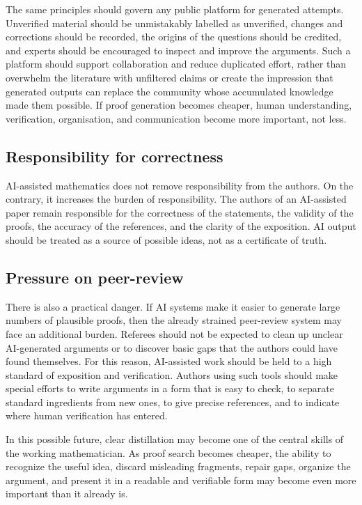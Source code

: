 \documentclass[11pt,reqno]{amsart}
\theoremstyle{plain}
\theoremstyle{definition}
\begin{document}
The same principles should govern any public platform for generated attempts. Unverified material should be unmistakably labelled as unverified, changes and corrections should be recorded, the origins of the questions should be credited, and experts should be encouraged to inspect and improve the arguments. Such a platform should support collaboration and reduce duplicated effort, rather than overwhelm the literature with unfiltered claims or create the impression that generated outputs can replace the community whose accumulated knowledge made them possible. If proof generation becomes cheaper, human understanding, verification, organisation, and communication become more important, not less.

\subsection{Responsibility for correctness}

AI-assisted mathematics does not remove responsibility from the authors.  On the contrary, it increases the burden of responsibility.  The authors of an AI-assisted paper remain responsible for the correctness of the statements, the validity of the proofs, the accuracy of the references, and the clarity of the exposition.  AI output should be treated as a source of possible ideas, not as a certificate of truth.

\subsection{Pressure on peer-review}

There is also a practical danger. If AI systems make it easier to generate large numbers of plausible proofs, then the already strained peer-review system may face an additional burden.  Referees should not be expected to clean up unclear AI-generated arguments or to discover basic gaps that the authors could have found themselves.  For this reason, AI-assisted work should be held to a high standard of exposition and verification. Authors using such tools should make special efforts to write arguments in a form that is easy to check, to separate standard ingredients from new ones, to give precise references, and to indicate where human verification has entered.

In this possible future, clear distillation may become one of the central skills of the working mathematician. As proof search becomes cheaper, the ability to recognize the useful idea, discard misleading fragments, repair gaps, organize the argument, and present it in a readable and verifiable form may become even more important than it already is.
\end{document}
